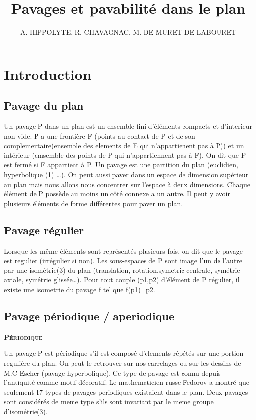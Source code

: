 \documentclass{article}
\title{Pavages et pavabilité dans le plan}
\author{A. HIPPOLYTE, R. CHAVAGNAC, M. DE MURET DE LABOURET}
\begin{document}
\maketitle

\tableofcontents

\section{Introduction}

\subsection{Pavage du plan}

Un pavage P dans un plan est un ensemble fini d'éléments compacts et d’interieur non vide.
P a une frontière F (points au contact de P et de son complementaire(ensemble des elements de E qui n'appartienent pas à P)) et un intérieur (emsemble des points de P qui n'appartiennent pas à F).
On dit que P est fermé si F appartient à P.
Un pavage est une partition du plan (euclidien, hyperbolique (1) …).
On peut aussi paver dans un espace de dimension supérieur au plan mais nous allons nous concentrer sur l’espace à deux dimensions.
Chaque élément de P possède au moins un côté connexe a un autre.
Il peut y avoir plusieurs éléments de forme différentes pour paver un plan.

\subsection{Pavage régulier}

Lorsque les même éléments sont représentés plusieurs fois, on dit que le pavage est regulier (irrégulier si non).
Les sous-espaces de P sont image l’un de l’autre par une isométrie(3) du plan (translation, rotation,symetrie centrale, symétrie axiale, symétrie glissée…).
Pour tout couple (p1,p2) d'élément de P régulier, il existe une isometrie du pavage f tel que f(p1)=p2.


\subsection{Pavage périodique / aperiodique}

\textbf{\textsc{Périodique}}

Un pavage P est périodique s'il est composé d'elements répétés sur une portion regulière du plan.
On peut le retrouver sur nos carrelages ou sur les dessins de M.C Escher (pavage hyperbolique).
Ce type de pavage est connu depuis l’antiquité comme motif décoratif.
Le mathematicien russe Fedorov a montré que seulement 17 types de pavages periodiques existaient dans le plan.
Deux pavages sont considérés de meme type s’ils sont invariant par le meme groupe d’isométrie(3).
\end{document}
